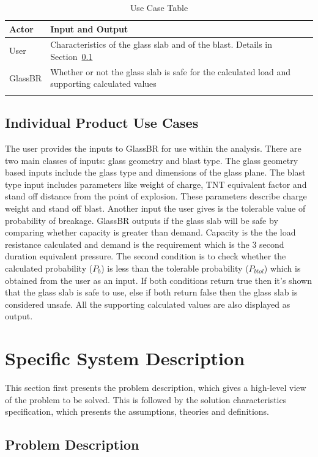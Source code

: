 \documentclass[12pt]{article}
\begin{document}
\begin{longtabu}{l X[l]}
\toprule
Actor & Input and Output
\\
\midrule
User & Characteristics of the glass slab and of the blast. Details in Section~\ref{sec_usecasedetails}
\\
GlassBR & Whether or not the glass slab is safe for the calculated load and supporting calculated values
\\
\bottomrule
\caption{Use Case Table}
\label{Table:UseCaseTabl}
\end{longtabu}
\subsection{Individual Product Use Cases}\label{sec_usecasedetails} 

The user provides the inputs to GlassBR for use within the analysis. There are
two main classes of inputs: glass geometry and blast type. The glass geometry
based inputs include the glass type and dimensions of the glass plane. The blast
type input includes parameters like weight of charge, TNT equivalent factor and
stand off distance from the point of explosion. These parameters describe charge
weight and stand off blast. Another input the user gives is the tolerable value
of probability of breakage. GlassBR outputs if the glass slab will be safe by
comparing whether capacity is greater than demand. Capacity is the the load
resistance calculated and demand is the requirement which is the 3 second
duration equivalent pressure. The second condition is to check whether the
calculated probability (${P_{b}}$) is less than the tolerable probability
(${P_{btol}}$) which is obtained from the user as an input. If both conditions
return true then it's shown that the glass slab is safe to use, else if both
return false then the glass slab is considered unsafe. All the supporting
calculated values are also displayed as output.

\section{Specific System Description}

This section first presents the problem description, which gives a high-level
view of the problem to be solved.  This is followed by the solution
characteristics specification, which presents the assumptions, theories and
definitions.

\subsection{Problem Description}
\end{document}
